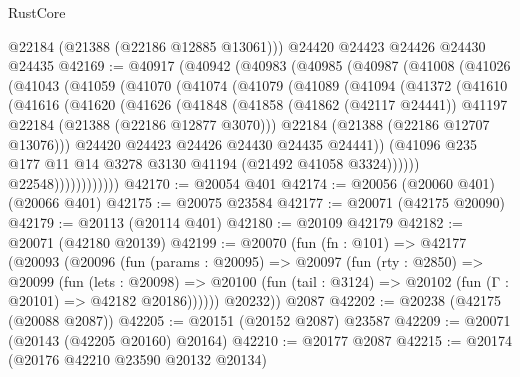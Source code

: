 \begin{lexlean}{RustCore}
\begin{coremodule}
      @22184
      (@21388 (@22186 @12885 @13061)))
    @24420
    @24423
    @24426
    @24430
    @24435
@42169 := @40917
    (@40942
      (@40983
        (@40985
          (@40987
            (@41008
              (@41026
                (@41043
                  (@41059
                    (@41070
                      (@41074
                        (@41079
                          (@41089
                            (@41094
                              (@41372
                                (@41610
                                  (@41616
                                    (@41620
                                      (@41626
                                        (@41848
                                          (@41858
                                            (@41862 (@42117 @24441))
                                            @41197
                                            @22184
                                            (@21388 (@22186 @12877 @3070)))
                                          @22184
                                          (@21388 (@22186 @12707 @13076)))
                                        @24420
                                        @24423
                                        @24426
                                        @24430
                                        @24435
                                        @24441))
                                    (@41096
                                      @235
                                      @177
                                      @11
                                      @14
                                      @3278
                                      @3130
                                      @41194
                                      (@21492 @41058 @3324))))))
                            @22548))))))))))))
@42170 := @20054 @401
@42174 := @20056 (@20060 @401) (@20066 @401)
@42175 := @20075 @23584
@42177 := @20071 (@42175 @20090)
@42179 := @20113 (@20114 @401)
@42180 := @20109 @42179
@42182 := @20071 (@42180 @20139)
@42199 := @20070
    (fun (fn : @101) =>
    @42177
      (@20093
        (@20096
          (fun (params : @20095) =>
          @20097
            (fun (rty : @2850) =>
            @20099
              (fun (lets : @20098) =>
              @20100 (fun (tail : @3124) => @20102 (fun (Γ : @20101) => @42182 @20186))))))
        @20232))
    @2087
@42202 := @20238 (@42175 (@20088 @2087))
@42205 := @20151 (@20152 @2087) @23587
@42209 := @20071 (@20143 (@42205 @20160) @20164)
@42210 := @20177 @2087
@42215 := @20174 (@20176 @42210 @23590 @20132 @20134)

\end{coremodule}
\end{lexlean}
